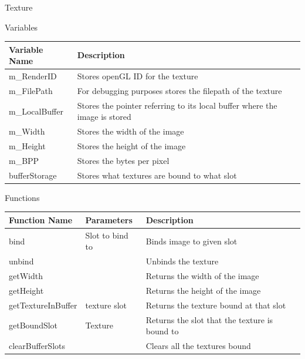 \documentclass[../../Main.tex]{subfiles}
\begin{document}
    Texture
    \begin{center}
        Variables
        \begin{tabular}{ | m{} | m{} | }
            \hline
            \textbf{Variable Name} & \textbf{Description} \\
            \hline
            m\_RenderID & Stores openGL ID for the texture \\
            \hline
            m\_FilePath & For debugging purposes stores the filepath of the texture \\
            \hline
            m\_LocalBuffer & Stores the pointer referring to its local buffer where the image is stored \\
            \hline
            m\_Width & Stores the width of the image \\
            \hline
            m\_Height & Stores the height of the image \\
            \hline
            m\_BPP & Stores the bytes per pixel \\
            \hline
            bufferStorage & Stores what textures are bound to what slot \\
            \hline
        \end{tabular}
        Functions
        \begin{tabular}{ | m{} | m{}| m{} | }
            \hline
            \textbf{Function Name} & \textbf{Parameters} & \textbf{Description} \\
            \hline
            bind & Slot to bind to & Binds image to given slot \\
            \hline
            unbind & & Unbinds the texture \\
            \hline
            getWidth & & Returns the width of the image \\
            \hline
            getHeight & & Returns the height of the image \\
            \hline
            getTextureInBuffer & texture slot & Returns the texture bound at that slot  \\
            \hline
            getBoundSlot & Texture & Returns the slot that the texture is bound to \\
            \hline
            clearBufferSlots & & Clears all the textures bound \\
            \hline
        \end{tabular}
    \end{center}
\end{document}
